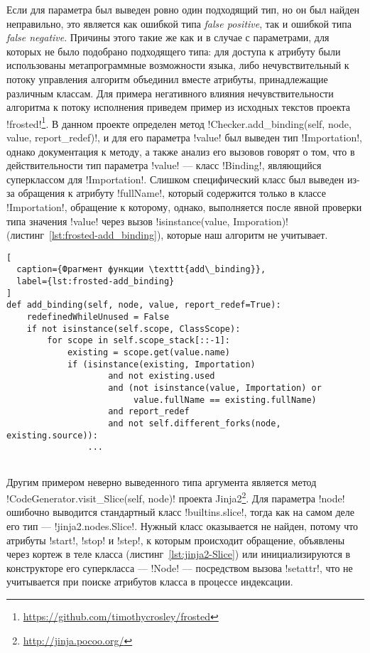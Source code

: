 Если для параметра был выведен ровно один подходящий тип, но он был найден
неправильно, это является как ошибкой типа \emph{false positive}, так и ошибкой типа
\emph{false negative}. Причины этого такие же как и в случае с параметрами, для
которых не было подобрано подходящего типа: для доступа к атрибуту были
использованы метапрограммные возможности языка, либо нечувствительный к потоку
управления алгоритм объединил вместе атрибуты, принадлежащие различным классам.
Для примера негативного влияния нечувствительности алгоритма к потоку исполнения
приведем пример из исходных текстов проекта
!frosted!\footnote{\url{https://github.com/timothycrosley/frosted}}. В данном
проекте определен метод !Checker.add_binding(self, node, value, report_redef)!, 
и для его параметра !value! был выведен тип !Importation!, однако документация к
методу, а также анализ его вызовов говорят о том, что в действительности тип
параметра !value! --- класс !Binding!, являющийся суперклассом для
!Importation!. Слишком специфический класс был выведен из-за обращения к
атрибуту !fullName!, который содержится только в классе !Importation!, обращение
к которому, однако, выполняется после явной проверки типа значения !value! через
вызов !isinstance(value, Imporation)! (листинг~\ref{lst:frosted-add_binding}),
которые наш алгоритм не учитывает. 

\begin{lstlisting}[
  caption={Фрагмент функции \texttt{add\_binding}},
  label={lst:frosted-add_binding}
]
def add_binding(self, node, value, report_redef=True):
    redefinedWhileUnused = False
    if not isinstance(self.scope, ClassScope):
        for scope in self.scope_stack[::-1]:
            existing = scope.get(value.name)
            if (isinstance(existing, Importation)
                    and not existing.used
                    and (not isinstance(value, Importation) or
                         value.fullName == existing.fullName)
                    and report_redef
                    and not self.different_forks(node, existing.source)):
                ...
    
\end{lstlisting}

Другим примером неверно выведенного типа аргумента является метод
!CodeGenerator.visit_Slice(self, node)! проекта
Jinja2\footnote{\url{http://jinja.pocoo.org/}}. Для параметра !node!
ошибочно выводится стандартный класс !builtins.slice!, тогда как на самом деле
его тип --- !jinja2.nodes.Slice!. Нужный класс оказывается не найден, потому что атрибуты
!start!, !stop! и !step!, к которым происходит обращение, объявлены через кортеж
в теле класса (листинг~\ref{lst:jinja2-Slice}) или инициализируются в
конструкторе его суперкласса --- !Node! --- посредством вызова !setattr!, что не
учитывается при поиске атрибутов класса в процессе индексации.

